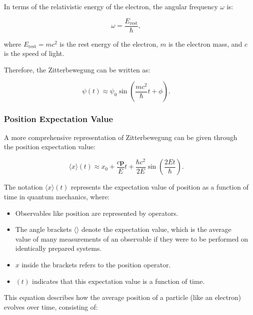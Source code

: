 \documentclass[%
 reprint,
 amsmath,amssymb,
 aps,
]{revtex4-1}
\numberwithin{equation}{section}%
\begin{document}
In terms of the relativistic energy of the electron, the angular frequency $\omega$ is:

\begin{equation}
    \omega = \frac{E_{\text{rest}}}{\hbar},
\end{equation}

\noindent where $E_{\text{rest}} = mc^2$ is the rest energy of the electron, $m$ is the electron mass, and $c$ is the speed of light.

Therefore, the Zitterbewegung can be written as:

\begin{equation}
    \psi(t) \approx \psi_0 \sin\left(\frac{mc^2}{\hbar} t + \phi\right).
\end{equation}


\subsubsection{\label{sec:Position Expectation Value}Position Expectation Value}

A more comprehensive representation of Zitterbewegung can be given through the position expectation value:

\begin{equation}
    \langle x \rangle(t) \approx x_0 + \frac{c\mathbf{p}}{E}t + \frac{\hbar c^2}{2E} \sin\left(\frac{2Et}{\hbar}\right) .
\end{equation}

The notation $\langle x \rangle(t)$ represents the expectation value of position as a function of time in quantum mechanics, where:

\begin{itemize}
    \item Observables like position are represented by operators.
    \item The angle brackets $\langle \rangle$ denote the expectation value, which is the average value of many measurements of an observable if they were to be performed on identically prepared systems.
    \item $x$ inside the brackets refers to the position operator.
    \item $(t)$ indicates that this expectation value is a function of time.
\end{itemize}

This equation describes how the average position of a particle (like an electron) evolves over time, consisting of:
\end{document}
